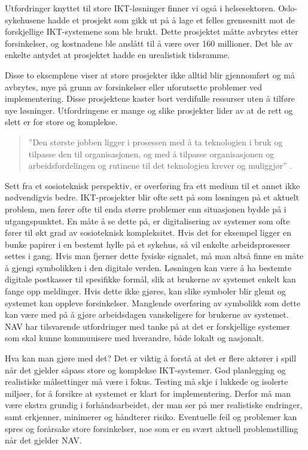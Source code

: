 \documentclass[informationsecurity]{gucmasterproject}
\begin{document}
Utfordringer knyttet til store IKT-løsninger finner vi også i helsesektoren. Oslo-sykehusene hadde et prosjekt som gikk ut på å lage et felles grensesnitt mot de forskjellige IKT-systemene som ble brukt. Dette prosjektet måtte avbrytes etter forsinkelser, og kostnadene ble anslått til å være over 160 millioner. Det ble av enkelte antydet at prosjektet hadde en urealistisk tidsramme.

Disse to eksemplene viser at store prosjekter ikke alltid blir gjennomført og må avbrytes, mye på grunn av forsinkelser eller uforutsette problemer ved implementering. Disse prosjektene kaster bort verdifulle ressurser uten å tilføre nye løsninger. Utfordringene er mange og slike prosjekter lider av at de rett og slett er for store og komplekse.

\begin{quote}
''Den største jobben ligger i prosessen med å ta teknologien i bruk og tilpasse den til organisasjonen, og med å tilpasse organisasjonen og arbeidsfordelingen og rutinene til det teknologien krever og muliggjør'' \cite{aanestad}.
\end{quote}

Sett fra et sosioteknisk perspektiv, er overføring fra ett medium til et annet ikke nødvendigvis bedre. IKT-prosjekter blir ofte sett på som løsningen på et aktuelt problem, men fører ofte til enda større problemer enn situasjonen bydde på i utgangspunktet. En måte å se dette på, er digitalisering av systemer som ofte fører til økt grad av sosioteknisk kompleksitet. Hvis det for eksempel ligger en bunke papirer i en bestemt hylle på et sykehus, så vil enkelte arbeidsprosesser settes i gang. Hvis man fjerner dette fysiske signalet, må man altså finne en måte å gjengi symbolikken i den digitale verden. Løsningen kan være å ha bestemte digitale postkasser til spesifikke formål, slik at brukerne av systemet enkelt kan fange opp meldinger. Hvis dette ikke gjøres, kan slike symboler blir glemt og systemet kan oppleve forsinkelser. Manglende overføring av symbolikk som dette kan være med på å gjøre arbeidsdagen vanskeligere for brukerne av systemet. NAV har tilsvarende utfordringer med tanke på at det er forskjellige systemer som skal kunne kommunisere med hverandre, både lokalt og nasjonalt.

Hva kan man gjøre med det?
Det er viktig å forstå at det er flere aktører i spill når det gjelder såpass store og komplekse IKT-systemer. God planlegging og realistiske målsettinger må være i fokus. Testing må skje i lukkede og isolerte miljøer, for å forsikre at systemet er klart for implementering.
Derfor må man være ekstra grundig i forhåndsarbeidet, der man ser på mer realistiske endringer, samt erkjenner, minimerer og håndterer risiko. Eventuelle feil og problemer kan spres og forårsake store forsinkelser, noe som er en svært aktuell problemstilling når det gjelder NAV.
\end{document}
